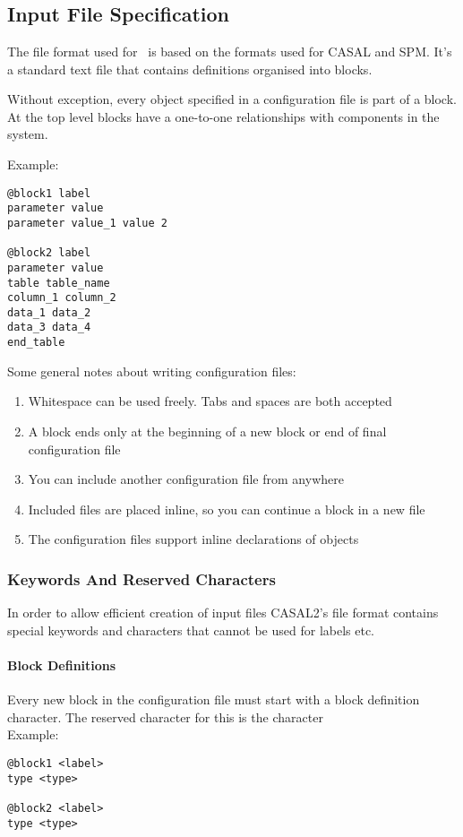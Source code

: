 
\section{\label{sec:examples}}

\subsection{Input File Specification}
The file format used for \CNAME\ is based on the formats used for CASAL and SPM. It's a standard text file that contains definitions organised into blocks.

Without exception, every object specified in a configuration file is part of a block. At the top level blocks have a one-to-one relationships with components in the system.

Example:
{\small{\begin{verbatim}
@block1 label
parameter value
parameter value_1 value 2

@block2 label
parameter value
table table_name
column_1 column_2
data_1 data_2
data_3 data_4
end_table
\end{verbatim}}}

Some general notes about writing configuration files:
\begin{enumerate}
	\item Whitespace can be used freely. Tabs and spaces are both accepted
	\item A block ends only at the beginning of a new block or end of final configuration file
	\item You can include another configuration file from anywhere
	\item Included files are placed inline, so you can continue a block in a new file
	\item The configuration files support inline declarations of objects
\end{enumerate}

\subsubsection{Keywords And Reserved Characters}
In order to allow efficient creation of input files CASAL2's file format contains special keywords and characters that cannot be used for labels etc.

\paragraph*{\command Block Definitions}
Every new block in the configuration file must start with a block definition character. The reserved character for this is the \command character\\
Example:
{\small{\begin{verbatim}
@block1 <label>
type <type>

@block2 <label>
type <type>
\end{verbatim}}}

